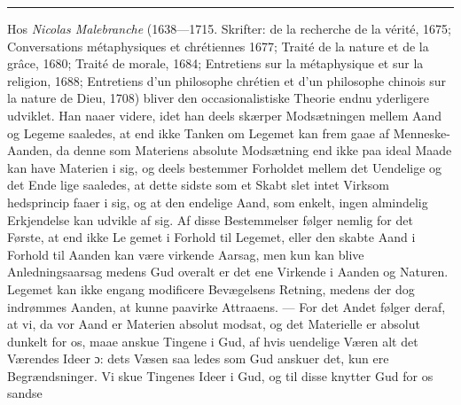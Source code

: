 \documentclass[12pt,a4paper]{book}
\newcommand{\divrule}{\begin{center}\rule{2cm}{0.4pt}\end{center}}
\begin{document}
\divrule

Hos \emph{Nicolas Malebranche} (1638---1715. Skrifter: de
la recherche de la vérité, 1675; Conversations métaphysiques
et chrétiennes 1677; Traité de la nature et de la grâce, 1680;
Traité de morale, 1684; Entretiens sur la métaphysique et sur
la religion, 1688; Entretiens d'un philosophe chrétien et d'un
philosophe chinois sur la nature de Dieu, 1708) bliver den
occasionalistiske Theorie endnu yderligere udviklet. Han naaer
videre, idet han deels skærper Modsætningen mellem Aand og
Legeme saaledes, at end ikke Tanken om Legemet kan frem\-%
gaae af Menneske-Aanden, da denne som Materiens absolute
Modsætning end ikke paa ideal Maade kan have Materien i sig, og
deels bestemmer Forholdet mellem det Uendelige og det Ende\-%
lige saaledes, at dette sidste som et Skabt slet intet Virksom\-%
hedsprincip faaer i sig, og at den endelige Aand, som enkelt,
ingen almindelig Erkjendelse kan udvikle af sig. Af disse
Bestemmelser følger nemlig for det Første, at end ikke Le\-%
gemet i Forhold til Legemet, eller den skabte Aand i Forhold
til Aanden kan være virkende Aarsag, men kun kan blive
Anledningsaarsag medens Gud overalt er det ene Virkende i
Aanden og Naturen. Legemet kan ikke engang modificere
Bevægelsens Retning, medens der dog indrømmes Aanden, at
kunne paavirke Attraaens. --- For det Andet følger deraf, at
vi, da vor Aand er Materien absolut modsat, og det Materielle
er absolut dunkelt for os, maae anskue Tingene i Gud, af hvis
uendelige Væren alt det Værendes Ideer ɔ: dets Væsen saa\-%
ledes som Gud anskuer det, kun ere Begrændsninger. Vi skue
Tingenes Ideer i Gud, og til disse knytter Gud for os sandse\-%
\end{document}
